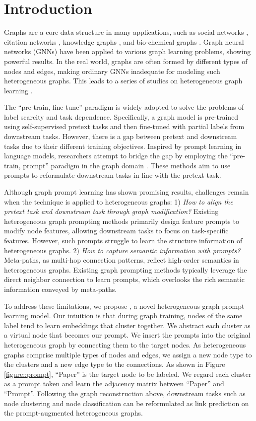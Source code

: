 \section{Introduction}

Graphs are a core data structure in many applications, such as social networks \cite{GraphSAGE,GraphRec,sigir24sun}, citation networks \cite{Planetoid,GCN}, knowledge graphs \cite{TransE,RotatE,www22KGwang}, and bio-chemical graphs \cite{Protein,GTPN}. Graph neural networks (GNNs) have been applied to various graph learning problems, showing powerful results. In the real world, graphs are often formed by different types of nodes and edges, making ordinary GNNs inadequate for modeling such heterogeneous graphs. This leads to a series of studies on heterogeneous graph learning \cite{HetGNN,HAN}.

The ``pre-train, fine-tune'' paradigm is widely adopted to solve the problems of label scarcity and task dependence. Specifically, a graph model is pre-trained using self-supervised pretext tasks \cite{GPTGNN,GraphCL} and then fine-tuned with partial labels from downstream tasks. However, there is a gap between pretext and downstream tasks due to their different training objectives. Inspired by prompt learning in language models, researchers attempt to bridge the gap by employing the ``pre-train, prompt'' paradigm in the graph domain \cite{GPPT,All,www25sun}. These methods aim to use prompts to reformulate downstream tasks in line with the pretext task.

Although graph prompt learning has shown promising results, challenges remain when the technique is applied to heterogeneous graphs: 1) \textit{How to align the pretext task and downstream task through graph modification?} Existing heterogeneous graph prompting methods primarily design feature prompts to modify node features, allowing downstream tasks to focus on task-specific features. However, such prompts struggle to learn the structure information of heterogeneous graphs. 2) \textit{How to capture semantic information with prompts?} Meta-paths, as multi-hop connection patterns, reflect high-order semantics in heterogeneous graphs. Existing graph prompting methods typically leverage the direct neighbor connection to learn prompts, which overlooks the rich semantic information conveyed by meta-paths.

To address these limitations, we propose \ourmethod, a novel heterogeneous graph prompt learning model. Our intuition is that during graph training, nodes of the same label tend to learn embeddings that cluster together. We abstract each cluster as a virtual node that becomes our prompt. We insert the prompts into the original heterogeneous graph by connecting them to the target nodes. As heterogeneous graphs comprise multiple types of nodes and edges, we assign a new node type to the clusters and a new edge type to the connections. As shown in Figure \ref{figure::prompt}, ``Paper'' is the target node to be labeled. We regard each cluster as a prompt token and learn the adjacency matrix between ``Paper'' and ``Prompt''. Following the graph reconstruction above, downstream tasks such as node clustering and node classification can be reformulated as link prediction on the prompt-augmented heterogeneous graphs.

